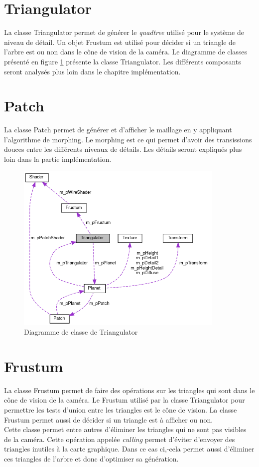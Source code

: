   \section{Triangulator}
  La classe Triangulator permet de générer le \emph{quadtree} utilisé pour le système de niveau de détail.
  Un objet Frustum est utilisé pour décider si un triangle de l'arbre est ou non dans le cône 
  de vision de la caméra. Le diagramme de classes présenté en figure \ref{fig:plan} présente la classe
  Triangulator. Les différents composants seront analysés plus loin dans le chapitre implémentation.
  
  \section{Patch}
  La classe Patch permet de générer et d'afficher le maillage en y appliquant l'algorithme de morphing.
  Le morphing est ce qui permet d'avoir des transissions douces entre les différents niveaux de détails.
  Les détails seront expliqués plus loin dans la partie implémentation.
  
  
  \begin{figure}
  \centering
  \includegraphics[width=10cm]{img/triangulator.png}
  \caption{Diagramme de classe de Triangulator}
  \label{fig:plan}
  \end{figure}
  
  \section{Frustum}
  La classe Frustum permet de faire des opérations sur les triangles qui sont dans le cône de vision de la caméra. Le Frustum utilisé par la classe Triangulator pour permettre les tests d'union entre les triangles est le cône de vision. La classe Frustum permet aussi de décider si un triangle est à afficher ou non.\\
  
  Cette classe permet entre autres d'éliminer les triangles qui ne sont pas visibles de la caméra. Cette opération appelée \textit{culling} permet d'éviter d'envoyer des triangles inutiles à la carte graphique.
  Dans ce cas ci,-cela permet aussi d'éliminer ces triangles de l'arbre et donc d'optimiser sa génération.
  
 \newpage %
 